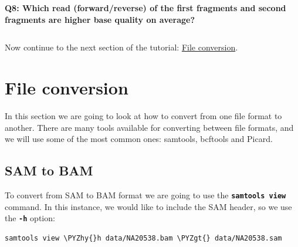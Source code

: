 \documentclass[11pt]{article}
\makeatletter
\def\PYZgt{\char`\>}
\def\PYZhy{\char`\-}
\newcommand{\boxspacing}{\kern\kvtcb@left@rule\kern\kvtcb@boxsep}
\newcommand{\prompt}[4]{
        {\ttfamily\llap{{\color{#2}[#3]:\hspace{3pt}#4}}\vspace{-\baselineskip}}
    }
\makeatother
\begin{document}
    \textbf{Q8: Which read (forward/reverse) of the first fragments and
second fragments are higher base quality on average?}

    \begin{tcolorbox}[breakable, size=fbox, boxrule=1pt, pad at break*=1mm,colback=cellbackground, colframe=cellborder]
\prompt{In}{incolor}{ }{\boxspacing}
\begin{Verbatim}[commandchars=\\\{\}]

\end{Verbatim}
\end{tcolorbox}

    Now continue to the next section of the tutorial:
\href{conversion.ipynb}{File conversion}.





\newpage





    \hypertarget{file-conversion}{%
\section{File conversion}\label{file-conversion}}

In this section we are going to look at how to convert from one file
format to another. There are many tools available for converting between
file formats, and we will use some of the most common ones: samtools,
bcftools and Picard.

\hypertarget{sam-to-bam}{%
\subsection{SAM to BAM}\label{sam-to-bam}}

To convert from SAM to BAM format we are going to use the
\textbf{\texttt{samtools\ view}} command. In this instance, we would
like to include the SAM header, so we use the \textbf{\texttt{-h}}
option:

    \begin{tcolorbox}[breakable, size=fbox, boxrule=1pt, pad at break*=1mm,colback=cellbackground, colframe=cellborder]
\prompt{In}{incolor}{ }{\boxspacing}
\begin{Verbatim}[commandchars=\\\{\}]
samtools view \PYZhy{}h data/NA20538.bam \PYZgt{} data/NA20538.sam
\end{Verbatim}
\end{tcolorbox}
\end{document}
